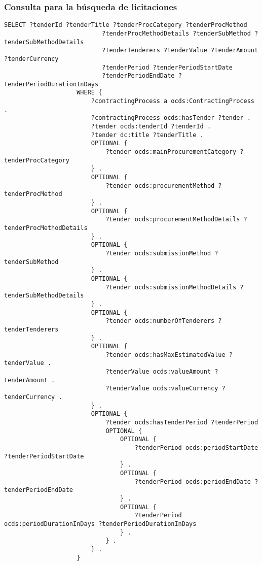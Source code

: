         \subsubsection{Consulta para la búsqueda de licitaciones}
            \begin{minipage}{\linewidth}
                \begin{lstlisting}[language=lSPARQL]
                    SELECT ?tenderId ?tenderTitle ?tenderProcCategory ?tenderProcMethod
                           ?tenderProcMethodDetails ?tenderSubMethod ?tenderSubMethodDetails 
                           ?tenderTenderers ?tenderValue ?tenderAmount ?tenderCurrency
                           ?tenderPeriod ?tenderPeriodStartDate 
                           ?tenderPeriodEndDate ?tenderPeriodDurationInDays
                    WHERE {
                        ?contractingProcess a ocds:ContractingProcess .
                        ?contractingProcess ocds:hasTender ?tender .
                        ?tender ocds:tenderId ?tenderId .
                        ?tender dc:title ?tenderTitle .
                        OPTIONAL {
                            ?tender ocds:mainProcurementCategory ?tenderProcCategory
                        } .
                        OPTIONAL {
                            ?tender ocds:procurementMethod ?tenderProcMethod
                        } .
                        OPTIONAL {
                            ?tender ocds:procurementMethodDetails ?tenderProcMethodDetails
                        } .
                        OPTIONAL {
                            ?tender ocds:submissionMethod ?tenderSubMethod
                        } .
                        OPTIONAL {
                            ?tender ocds:submissionMethodDetails ?tenderSubMethodDetails
                        } .
                        OPTIONAL {
                            ?tender ocds:numberOfTenderers ?tenderTenderers
                        } .
                        OPTIONAL {
                            ?tender ocds:hasMaxEstimatedValue ?tenderValue .
                            ?tenderValue ocds:valueAmount ?tenderAmount .
                            ?tenderValue ocds:valueCurrency ?tenderCurrency .
                        } .
                        OPTIONAL {
                            ?tender ocds:hasTenderPeriod ?tenderPeriod
                            OPTIONAL {
                                OPTIONAL {
                                    ?tenderPeriod ocds:periodStartDate ?tenderPeriodStartDate
                                } .
                                OPTIONAL {
                                    ?tenderPeriod ocds:periodEndDate ?tenderPeriodEndDate
                                } .
                                OPTIONAL {
                                    ?tenderPeriod ocds:periodDurationInDays ?tenderPeriodDurationInDays
                                } .
                            } .
                        } .
                    }
                \end{lstlisting}
            \end{minipage}
            
